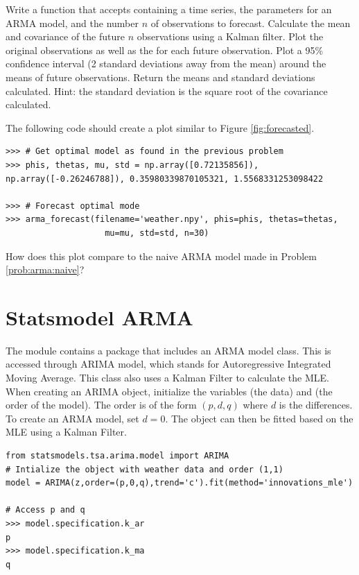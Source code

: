 \begin{problem}
\label{prob:arma:forecast}
Write a function  that accepts  containing a time series, the parameters for an ARMA model, and the number $n$ of observations to forecast.
Calculate the mean and covariance of the future $n$ observations using a Kalman filter.
Plot the original observations as well as the  for each future observation.
Plot a 95\% confidence interval (2 standard deviations away from the mean) around the means of future observations.
Return the means and standard deviations calculated.
\noindent Hint: the standard deviation is the square root of the covariance calculated.

The following code should create a plot similar to Figure \ref{fig:forecasted}.

\begin{lstlisting}
>>> # Get optimal model as found in the previous problem
>>> phis, thetas, mu, std = np.array([0.72135856]), np.array([-0.26246788]), 0.35980339870105321, 1.5568331253098422

>>> # Forecast optimal mode
>>> arma_forecast(filename='weather.npy', phis=phis, thetas=thetas, 
                    mu=mu, std=std, n=30)
\end{lstlisting}

\noindent How does this plot compare to the naive ARMA model made in Problem \ref{prob:arma:naive}?
\end{problem}

\section*{Statsmodel ARMA}

The module  contains a package that includes an ARMA model class.
This is accessed through ARIMA model, which stands for Autoregressive Integrated Moving Average.
This class also uses a Kalman Filter to calculate the MLE.
When creating an ARIMA object, initialize the variables  (the data) and  (the order of the model).
The order is of the form $(p,d,q)$ where $d$ is the differences.
To create an ARMA model, set $d=0$.
The object can then be fitted based on the MLE using a Kalman Filter.

\begin{lstlisting}
from statsmodels.tsa.arima.model import ARIMA
# Intialize the object with weather data and order (1,1)
model = ARIMA(z,order=(p,0,q),trend='c').fit(method='innovations_mle')

# Access p and q
>>> model.specification.k_ar
p
>>> model.specification.k_ma
q
\end{lstlisting}


